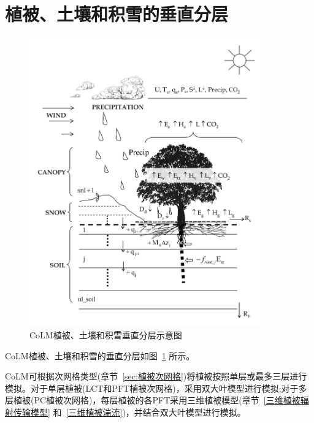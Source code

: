 \section{植被、土壤和积雪的垂直分层}\label{土壤和积雪的垂直分层}

{
  \begin{figure}[htbp]
    \centering
    \includegraphics[width=0.9\textwidth]{Figures/模式构架/CoLM模式概念图.jpg}
    \caption[CoLM植被、土壤和积雪垂直分层示意图]{CoLM植被、土壤和积雪垂直分层示意图}
    \label{fig:CoLM垂直分层}
  \end{figure}
}

CoLM植被、土壤和积雪的垂直分层如图~\ref{fig:CoLM垂直分层} 所示。

CoLM可根据次网格类型(章节~\ref{sec:植被次网格})将植被按照单层或最多三层进行模拟。对于单层植被(LCT和PFT植被次网格)，采用双大叶模型进行模拟\citep{dai2004two};对于多层植被(PC植被次网格)，每层植被的各PFT采用三维植被模型(章节~\ref{三维植被辐射传输模型} 和~\ref{三维植被湍流})，并结合双大叶模型进行模拟。

